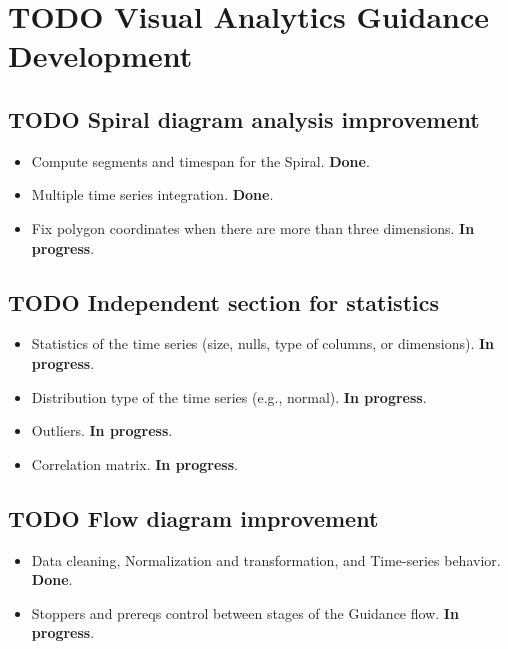 \documentclass[a4paper]{article}
\begin{document}
\section{{\bfseries\sffamily TODO} Visual Analytics Guidance Development}
\label{sec:org2822504}

\subsection{{\bfseries\sffamily TODO} Spiral diagram analysis improvement}
\label{sec:orgd1b31bf}

\begin{itemize}
\item Compute segments and timespan for the Spiral. \textbf{Done}.

\item Multiple time series integration. \textbf{Done}.

\item Fix polygon coordinates when there are more than three dimensions. \textbf{In progress}.
\end{itemize}

\subsection{{\bfseries\sffamily TODO} Independent section for statistics}
\label{sec:orgbe17eb6}

\begin{itemize}
\item Statistics of the time series (size, nulls, type of columns, or dimensions). \textbf{In progress}.

\item Distribution type of the time series (e.g., normal). \textbf{In progress}.

\item Outliers. \textbf{In progress}.

\item Correlation matrix. \textbf{In progress}.
\end{itemize}

\subsection{{\bfseries\sffamily TODO} Flow diagram improvement}
\label{sec:orgd037b9a}

\begin{itemize}
\item Data cleaning, Normalization and transformation, and Time-series behavior. \textbf{Done}.

\item Stoppers and prereqs control between stages of the Guidance flow. \textbf{In progress}.
\end{itemize}
\end{document}
